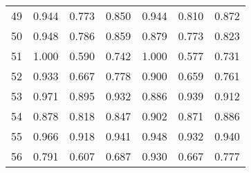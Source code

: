 \begin{table}[H]
\begin{tabular}{lcccccc}
    49 & 0.944 & 0.773 & 0.850 & 0.944 & 0.810 & 0.872 \\
    50 & 0.948 & 0.786 & 0.859 & 0.879 & 0.773 & 0.823 \\
    51 & 1.000 & 0.590 & 0.742 & 1.000 & 0.577 & 0.731 \\
    52 & 0.933 & 0.667 & 0.778 & 0.900 & 0.659 & 0.761 \\
    53 & 0.971 & 0.895 & 0.932 & 0.886 & 0.939 & 0.912 \\
    54 & 0.878 & 0.818 & 0.847 & 0.902 & 0.871 & 0.886 \\
    55 & 0.966 & 0.918 & 0.941 & 0.948 & 0.932 & 0.940 \\
    56 & 0.791 & 0.607 & 0.687 & 0.930 & 0.667 & 0.777 \\
\hline
\end{tabular}
\end{table}
